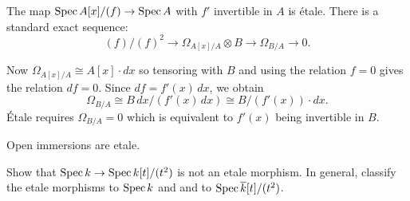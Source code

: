 \documentclass[12pt]{article}
\begin{document}
\begin{example}
    The map $\operatorname{Spec} A[x]/(f) \to \operatorname{Spec} A$ with $f'$ invertible in $A$ is étale.
    There is a standard exact sequence:
    \[
        (f)/(f)^2 \longrightarrow \Omega_{A[x]/A} \otimes B \longrightarrow \Omega_{B/A} \to 0.
    \]

    Now $\Omega_{A[x]/A} \cong A[x]\cdot dx$ so tensoring with $B$ and using the relation $f=0$ gives the relation $df=0$. Since $df = f'(x)\,dx$, we obtain
    \[
        \Omega_{B/A} \cong B\,dx / (f'(x)\,dx) \cong B/(f'(x)) \cdot dx.
    \]
    Étale requires $\Omega_{B/A} = 0$ which is equivalent to $f'(x)$ being invertible in $B$.

\end{example}

\begin{example}
    Open immersions are etale.
\end{example}

\begin{exercise}
    Show that $\operatorname{Spec} k \to \operatorname{Spec} k[t]/(t^2)$ is not an etale morphism. In general, classify the etale morphisms to $\operatorname{Spec} k$ and and to $\operatorname{Spec} \overline{k}[t]/(t^2)$.
\end{exercise}
\end{document}
